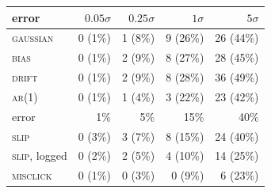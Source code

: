 \begin{tabular}{lrrrr}
\toprule
error & $0.05\sigma$ & $0.25\sigma$ & $1\sigma$ & $5\sigma$ \\
\midrule
\textsc{gaussian} & 0 (1\%) & 1 (8\%) & 9 (26\%) & 26 (44\%) \\
\textsc{bias} & 0 (1\%) & 2 (9\%) & 8 (27\%) & 28 (45\%) \\
\textsc{drift} & 0 (1\%) & 2 (9\%) & 8 (28\%) & 36 (49\%) \\
\textsc{ar}(1) & 0 (1\%) & 1 (4\%) & 3 (22\%) & 23 (42\%) \\
\midrule
error & 1\% & 5\% & 15\% & 40\% \\
\midrule
\textsc{slip} & 0 (3\%) & 3 (7\%) & 8 (15\%) & 24 (40\%) \\
\textsc{slip}, logged & 0 (2\%) & 2 (5\%) & 4 (10\%) & 14 (25\%) \\
\textsc{misclick} & 0 (1\%) & 0 (3\%) & 0 (9\%) & 6 (23\%) \\
\bottomrule
\end{tabular}
